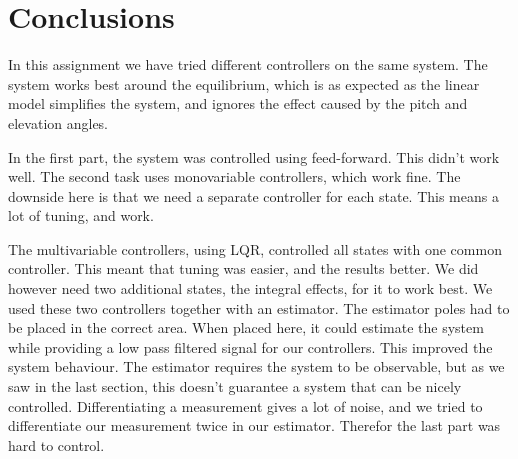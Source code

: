 \section{Conclusions}
In this assignment we have tried different controllers on the same system. The system works best around the equilibrium, which is as expected as the linear model simplifies the system, and ignores the effect caused by the pitch and elevation angles.\medskip

In the first part, the system was controlled using feed-forward. This didn't work well. The second task uses monovariable controllers, which work fine. The downside here is that we need a separate controller for each state. This means a lot of tuning, and work.\medskip

The multivariable controllers, using LQR, controlled all states with one common controller. This meant that tuning was easier, and the results better. We did however need two additional states, the integral effects, for it to work best. We used these two controllers together with an estimator. The estimator poles had to be placed in the correct area. When placed here, it could estimate the system while providing a low pass filtered signal for our controllers. This improved the system behaviour. The estimator requires the system to be observable, but as we saw in the last section, this doesn't guarantee a system that can be nicely controlled. Differentiating a measurement gives a lot of noise, and we tried to differentiate our measurement twice in our estimator. Therefor the last part was hard to control. 
